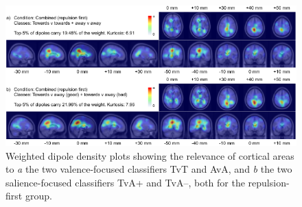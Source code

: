 \begin{figure}[b]
    \centering
    \includegraphics[width=\textwidth]{figures/salval-negfirst-wdd-combined-sum.pdf}
    \caption[Weighted dipole density plots of the combined salience- and valence-focused classifiers, for the repulsion-first group.]{Weighted dipole density plots showing the relevance of cortical areas to \emph{a} the two valence-focused classifiers TvT and AvA, and \emph{b} the two salience-focused classifiers TvA+ and TvA--, both for the repulsion-first group.}
    \label{salval:fig:negfirst-wdd-combined-sum}
\end{figure}




\clearpage
\pagestyle{empty}
\null\cleardoublepage
\pagestyle{plain}
